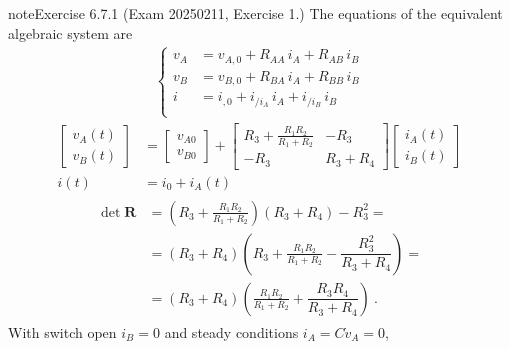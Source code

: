 \documentclass[letterpaper,10pt,english]{jupyterBook}
\begin{document}
\begin{sphinxadmonition}{note}{Exercise 6.7.1 (Exam 2025\sphinxhyphen{}02\sphinxhyphen{}11, Exercise 1.)}
\sphinxAtStartPar
The equations of the equivalent algebraic system are
\begin{equation*}
\begin{split}\begin{cases}
 v_A & = v_{A,0} + R_{AA}   \, i_A + R_{AB}   \, i_B \\
 v_B & = v_{B,0} + R_{BA}   \, i_A + R_{BB}   \, i_B \\
 i   & = i_{ ,0} + i_{/i_A} \, i_A + i_{/i_B} \, i_B \\
\end{cases}\end{split}
\end{equation*}\begin{equation*}
\begin{split}
\begin{bmatrix} v_A(t) \\ v_B(t) \end{bmatrix} & =
\begin{bmatrix} v_{A0} \\ v_{B0} \end{bmatrix} + 
\begin{bmatrix}
  R_3 + \frac{R_1 R_2}{R_1 + R_2} & -R_3 \\ -R_3 & R_3 + R_4
\end{bmatrix}
\begin{bmatrix} i_A(t) \\ i_B(t) \end{bmatrix} \\
i(t) & = i_0 + i_A(t)
\end{split}
\end{equation*}\begin{equation*}
\begin{split}\begin{aligned}
  \det \mathbf{R}
  & = \left( R_3 + \frac{R_1 R_2}{R_1 + R_2}  \right) \left( R_3 + R_4 \right) - R_3^2 = \\
  & = ( R_3 + R_4 ) \left( R_3 + \frac{R_1 R_2}{R_1 + R_2} - \dfrac{R_3^2}{R_3 + R_4} \right) = \\
  & = ( R_3 + R_4 ) \left( \frac{R_1 R_2}{R_1 + R_2} + \dfrac{R_3 R_4}{R_3 + R_4} \right) \ .
\end{aligned}\end{split}
\end{equation*}
\sphinxAtStartPar
{} With switch open \(i_B = 0\) and steady conditions \(i_A = C \dot{v}_A = 0\),
\begin{equation*}

\end{equation*}
\end{sphinxadmonition}
\end{document}
